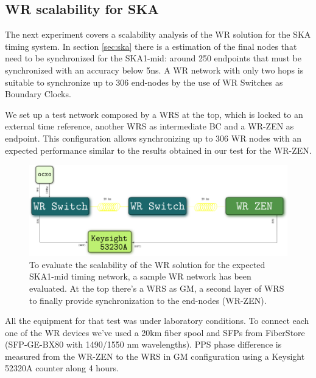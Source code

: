 \subsection{WR scalability for SKA} %
\label{subsec: net_exp}

The next experiment covers a scalability analysis of the WR solution for the 
SKA timing system. In section \ref{sec:ska} there is a estimation of the final 
nodes that need to be synchronized for the SKA1-mid: around 250 endpoints that 
must be synchronized with an accuracy below 5ns. A WR network with only two 
hops is suitable to synchronize up to 306 end-nodes by the use of WR Switches as 
Boundary Clocks.

We set up a test network composed by a WRS at the top, which is locked to an 
external time reference, another WRS as intermediate BC and a WR-ZEN as 
endpoint. This configuration allows synchronizing up to 306 WR nodes with an 
expected performance similar to the results obtained in our test for the WR-ZEN.

\begin{figure}
	\centering
	\includegraphics[width=0.7\linewidth]{img/prueba_red}
	\caption[WR Scalability test's setup for SKA]{To evaluate the scalability 
	of the WR solution for the expected SKA1-mid timing network, a sample WR 
	network has been evaluated. At the top there's a WRS as GM, a second layer 
	of WRS to finally provide synchronization to the end-nodes (WR-ZEN).}
	\label{fig:pruebared}
\end{figure}


All the equipment for that test was under laboratory conditions. To connect 
each one of the WR devices we've used a 20km fiber spool and SFPs from 
FiberStore (SFP-GE-BX80 with 1490/1550 nm wavelengths). PPS phase difference is 
measured from the WR-ZEN to the WRS in GM configuration using a Keysight 52320A 
counter along 4 hours.

